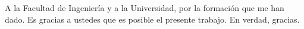 \quote

A la Facultad de Ingeniería y a la Universidad, por la formación que me han dado.
Es gracias a ustedes que es posible el presente trabajo.
En verdad, gracias.

\endquote